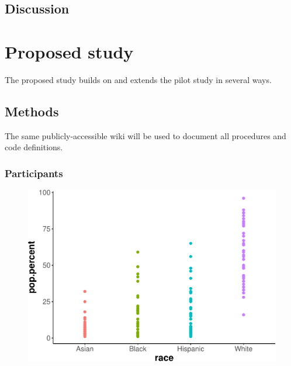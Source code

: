 \documentclass[english,man]{apa6}
\theoremstyle{definition}
\theoremstyle{definition}
\theoremstyle{definition}
\theoremstyle{remark}
\begin{document}
\subsection{Discussion}\label{discussion}

\section{Proposed study}\label{proposed-study}

The proposed study builds on and extends the pilot study in several
ways.

\subsection{Methods}\label{methods-1}

The same publicly-accessible wiki \cite{PLAY-wiki} will be used to
document all procedures and code definitions.

\subsubsection{Participants}\label{participants-1}

\begin{figure}
\centering
\includegraphics{ibad-ms_files/figure-latex/PLAY-race-plot-1.pdf}
\caption{}
\end{figure}
\end{document}

